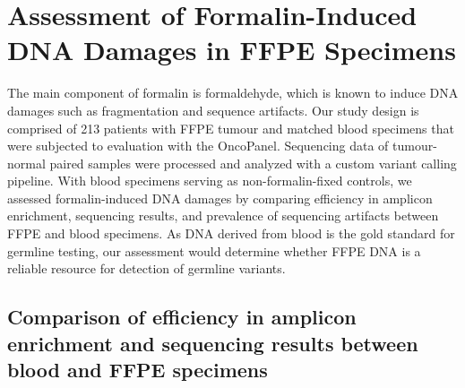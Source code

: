 
\chapter{Assessment of Formalin-Induced DNA Damages in FFPE Specimens}
\label{ch:AssessmentofFormalin-InducedDNADamagesinFFPESpecimens}

The main component of formalin is formaldehyde, which is known to induce DNA damages such as fragmentation and sequence artifacts. Our study design is comprised of 213 patients with FFPE tumour and matched blood specimens that were subjected to evaluation with the OncoPanel. Sequencing data of tumour-normal paired samples were processed and analyzed with a custom variant calling pipeline. With blood specimens serving as non-formalin-fixed controls, we assessed formalin-induced DNA damages by comparing efficiency in amplicon enrichment, sequencing results, and prevalence of sequencing artifacts between FFPE and blood specimens. As DNA derived from blood is the gold standard for germline testing, our assessment would determine whether FFPE DNA is a reliable resource for detection of germline variants.

\section{Comparison of efficiency in amplicon enrichment and sequencing results between blood and FFPE specimens}
\label{sec:ComparisonofefficiencyinampliconenrichmentandsequencingresultsbetweenbloodandFFPEspecimens}



